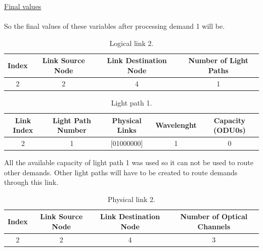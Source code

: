 \underline{Final values}\\ \\
So the final values of these variables after processing demand 1 will be.
\begin{table}[H]
	\centering
	\begin{tabular}{|c|c|c|c|}
		\hline
		Index & Link Source Node & Link Destination Node & Number of Light Paths \\ \hline
		2     & 2           & 4                 & 1                \\  \hline
	\end{tabular}
	\caption{Logical link 2.}
	\label{logicalLink_variable}
\end{table}

\begin{table}[H]
	\centering
	\begin{tabular}{|c|c|c|c|c|}
		\hline
		Link Index & Light Path Number & Physical Links  & Wavelenght & Capacity (ODU0s) \\ \hline
		2          & 1                 & {[}01000000{]} & 1 & 0    \\ 	\hline
	\end{tabular}
	\caption{Light path 1.}
	\label{lightpath_example}
\end{table}

All the available capacity of light path 1 was used so it can not be used to route other demands. Other light paths will have to be created to route demands through this link.

\begin{table}[H]
	\centering
	\begin{tabular}{|c|c|c|c|}
		\hline
		Index & Link Source Node & Link Destination Node & Number of Optical Channels \\ \hline
		2     & 2            & 4                 & 3                        \\ \hline
	\end{tabular}
	\caption{Physical link 2.}
	\label{link_example}
\end{table}

